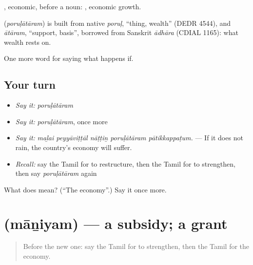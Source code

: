 , economic, before a noun:  , economic growth.

\begin{cousinweb}
\textbf{} (\emph{poruḷātāram}) is built from native \emph{poruḷ}, \textquotedblleft{}thing, wealth\textquotedblright{} (DEDR 4544), and \emph{ātāram}, \textquotedblleft{}support, basis\textquotedblright{}, borrowed from Sanskrit \emph{ādhāra} (CDIAL 1165): what wealth rests on.
\end{cousinweb}

\begin{grammarlens}[title={What you've built}]
One more word for saying what happens if.
\end{grammarlens}

\subsection*{Your turn}
\begin{itemize}
\raggedright
  \item \emph{Say it:} \emph{poruḷātāram}
  \item \emph{Say it:} \emph{poruḷātāram}, once more
  \item \emph{Say it:} \emph{maḻai peyyāviṭṭāl nāṭṭiṉ poruḷātāram pātikkappaṭum.} — If it does not rain, the country's economy will suffer.
  \item \emph{Recall:} say the Tamil for to restructure, then the Tamil for to strengthen, then say \emph{poruḷātāram} again
\end{itemize}

\begin{tcolorbox}[breakable,colback=teal!4,colframe=teal!35!black,title={Before you move on}]
What does  mean? (\textquotedblleft{}The economy\textquotedblright{}.) Say it once more.
\end{tcolorbox}
\section[\texorpdfstring{\ta{மானியம்} (māṉiyam)}{மானியம் (māṉiyam)}]{ (māṉiyam) — a subsidy; a grant}

\label{lesson:TA-C391-maniyam}



\begin{quote}
Before the new one: say the Tamil for to strengthen, then the Tamil for the economy.
\end{quote}

